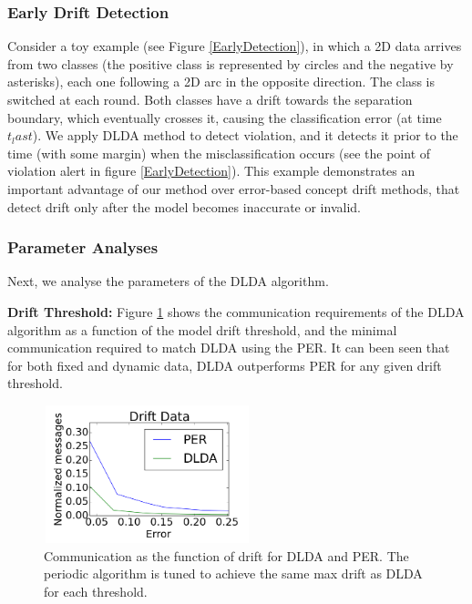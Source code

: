 \documentclass{sig-alternate-05-2015}
\begin{document}
\subsubsection{Early Drift Detection}\label{sec:earlydetection}
Consider a toy example (see Figure \ref{EarlyDetection}), in which a 2D data arrives from two classes (the positive class is represented by circles and the negative by asterisks), each one following a 2D arc in the opposite direction. The class is switched at each round. Both classes have a drift towards the separation boundary, which eventually crosses it, causing the classification error (at time $t_last$). We apply DLDA method to detect violation, and it detects it prior to the time  (with some margin) when the misclassification occurs (see the point of violation alert in figure \ref{EarlyDetection}). This example demonstrates an important advantage of our method over error-based concept drift methods, that detect drift only after the model becomes inaccurate or invalid.

\subsubsection{Parameter Analyses}\label{sec:paramanal}
Next, we analyse the parameters of the DLDA algorithm. 

\noindent\textbf{Drift Threshold:} Figure \ref{PERvsDLDAoverError} shows the communication requirements of the DLDA algorithm as a function of the model drift threshold, and the minimal communication required to match DLDA using the PER.	
It can been seen that for both fixed and dynamic data, DLDA outperforms PER for
any given drift threshold.
 \begin{figure}[ht]
	\centering
	\includegraphics[width=60mm, height=4cm]{PER/onlyDrift.png}
	\caption{Communication as the function of drift for DLDA and PER. The
	periodic algorithm is tuned to achieve the same max drift as DLDA
	for each threshold.}
	\label{PERvsDLDAoverError}
	\end{figure}
\end{document}
